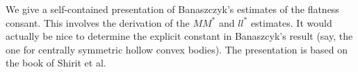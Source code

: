 \documentclass[11pt]{article}
\numberwithin{equation}{section}
\numberwithin{thm}{section}
\begin{document}
	
We give a self-contained presentation of Banaszczyk's estimates of the flatness consant. This involves the derivation of the $MM^\ast$ and $ll^\ast$ estimates. It would actually be nice to determine the explicit constant in Banaszcyk's result (say, the one for centrally symmetric hollow convex bodies). The presentation is based on the book of Shirit et al. 

 

 
\end{document}
